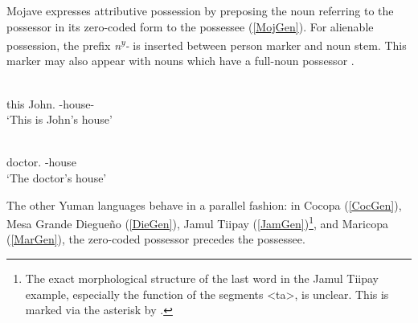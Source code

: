 Mojave expresses attributive possession by preposing the noun referring to the possessor in its zero-coded form  to the possessee (\ref{MojGen}).
For alienable possession, the prefix \emph{n\textsuperscript{y}-} is inserted between person marker and noun stem. 
This marker may also appear with nouns which have a full-noun possessor \citep[16--18]{Munro:1976}.

\begin{exe}\ex\label{MojGen}
\begin{xlist}\ex\gll {} \textbf{} \\
this John.\acc{} \poss{}-house-\nom{}\\
\glt `This is John's house' 

\ex\gll \textbf{} \\
doctor.\acc{} \poss{}-house\\
\glt `The doctor's house' %
\end{xlist}
\end{exe}



%

The other Yuman languages behave in a parallel fashion:\enlargethispage{2\baselineskip}
in Cocopa (\ref{CocGen}), Mesa Grande Diegue\~no (\ref{DieGen}), Jamul Tiipay (\ref{JamGen})\footnote{The exact morphological structure of the last word in the Jamul Tiipay example, especially the function of the segments <ta>, is unclear. This is marked via the asterisk by \citet{Miller:2001}.}, and Maricopa (\ref{MarGen}), the zero-coded possessor precedes the possessee.

